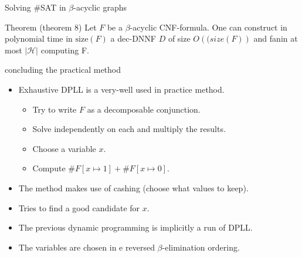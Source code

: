 \begin{frame}[t]{Solving \#SAT in $\beta$-acyclic graphs}
	\begin{block}{Theorem (theorem 8)}
		Let $F$ be a $\beta$-acyclic CNF-formula. One can construct in polynomial time in $\mathrm{size}(F)$ a dec-DNNF $D$ of size $O(\mathrm(size(F))$ and fanin at most $|\mathcal{H}|$ computing F.
	\end{block}
\end{frame}

\begin{frame}[t]{concluding the practical method}
	\begin{itemize}[<+->]
		\item Exhaustive DPLL is a very-well used in practice method.
			\begin{itemize}
				\item Try to write $F$ as a decomposable conjunction. 
				\item[] \hspace{1cm}Solve independently on each and multiply the results.
				\item Choose a variable $x$.
				\item[] \hspace{1cm}Compute $\#F[x\mapsto 1] + \#F[x\mapsto 0]$.
			\end{itemize}
		\item The method makes use of cashing (choose what values to keep).
		\item Tries to find a good candidate for $x$.
		\item The previous dynamic programming is implicitly a run of DPLL. 
		\item The variables are chosen in e reversed $\beta$-elimination ordering. 
	\end{itemize}
\end{frame}
